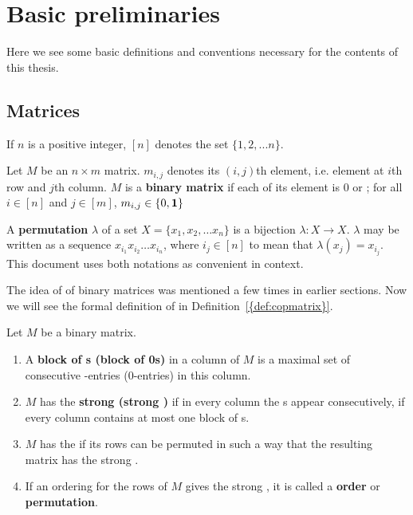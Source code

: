\section[Basic preliminaries]{Basic preliminaries} 
\label{sec:basicprelim}

Here we see some basic definitions and conventions necessary for the contents
of this thesis.

\subsection{Matrices}
If $n$ is a positive integer, $[n]$ denotes the set $\{1,2,... n\}$.

\begin{definition}
  \label{def:binmatrix}
  Let $M$ be an $n \times m$ matrix. $m_{i,j}$ denotes its $(i,j)$th
  element, i.e. element at $i$th row and $j$th column. $M$ is a
  \textbf{binary matrix} if each of its element is 0 or \un; for all
  $i \in [n]$ and $j \in [m]$, $m_{i,j} \in \{0, \textbf{1}\}$
\end{definition}

\begin{definition}[Permutation]
  A \textbf{permutation} $\lambda$ of a set $X = \{x_1, x_2, \ldots
  x_n\}$ is a bijection $\lambda: X \rightarrow X$.  $\lambda$ may be
  written as a sequence $x_{i_1}x_{i_2}\ldots x_{i_n}$, where $i_j \in
  [n]$ to mean that $\lambda(x_j)= x_{i_j}$.  This document uses both
  notations as convenient in context.
\end{definition}

The idea of \cop of binary matrices was mentioned a few times in
earlier sections. Now we will see the formal definition of \COP in
Definition~\ref{{def:copmatrix}}.

\begin{definition}
  \label{def:copmatrix}
  Let $M$ be a binary matrix.
  \begin{enumerate}
  \hangindent {}
  \item A \textbf{block of \un s (block of 0s)} in a column of $M$ is a maximal set of
    consecutive \un-entries (0-entries) in this column.
  \item $M$ has the \textbf{strong \cop
      (strong \COP)} if in every column the \un s appear consecutively,
    \ie if every column contains at most one block of \un s.
  \item $M$ has the \textbf{\cop} if its rows can be
    permuted in such a way that the resulting matrix has the strong \COP.
  \item If an ordering for the rows of $M$ gives the strong \COP, it
    is called a \textbf{\COP order} or \textbf{\COP permutation}.
  \end{enumerate}
\end{definition}


